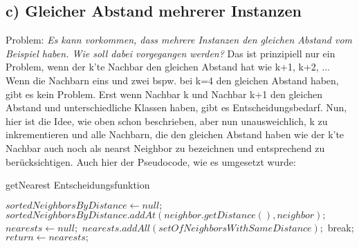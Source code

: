 \documentclass[11pt, oneside]{article}
\begin{document}
\subsection{c) Gleicher Abstand mehrerer Instanzen}
Problem: \textit{Es kann vorkommen, dass mehrere Instanzen den gleichen Abstand vom Beispiel haben. Wie soll dabei vorgegangen werden?}\newline
Das ist prinzipiell nur ein Problem, wenn der k'te Nachbar den gleichen Abstand hat wie k+1, k+2, ... 
Wenn die Nachbarn eins und zwei bspw. bei k=4 den gleichen Abstand haben, gibt es kein Problem.\newline
Erst wenn Nachbar k und Nachbar k+1 den gleichen Abstand und unterschiedliche Klassen haben, gibt es Entscheidungsbedarf.
Nun, hier ist die Idee, wie oben schon beschrieben, aber nun unausweichlich, k zu inkrementieren und alle Nachbarn, die den gleichen Abstand haben wie der k'te Nachbar auch noch als nearst Neighbor zu bezeichnen und entsprechend zu berücksichtigen.\newline
Auch hier der Pseudocode, wie es umgesetzt wurde:

\begin{algorithm}[H]
\caption{getNearest Entscheidungsfunktion}\label{euclid}
\begin{algorithmic}[1]

\State $sortedNeighborsByDistance \gets null;$
	\State $sortedNeighborsByDistance.addAt(neighbor.getDistance(), neighbor);$
\EndFor
\State $nearests \gets null;$
	\State $nearests.addAll(setOfNeighborsWithSameDistance);$
		\State break;
	\EndIf
\EndFor
\State $return \gets nearests;$

\EndFunction
\end{algorithmic}
\end{algorithm}
\end{document}
